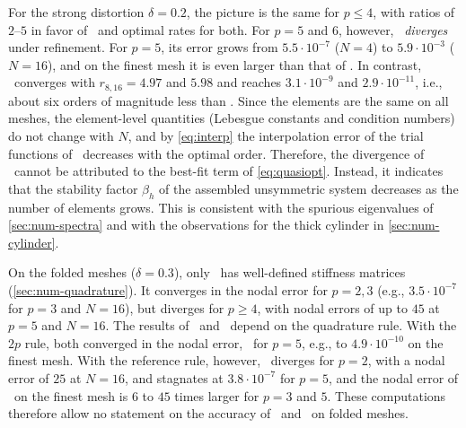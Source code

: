 For the strong distortion $\delta=0.2$, the picture is the same for $p\le4$, with ratios of $2$--$5$ in favor of \PM\ and optimal rates for both. For $p=5$ and $6$, however, \PM\ \emph{diverges} under refinement. For $p=5$, its error grows from $5.5\cdot10^{-7}$ ($N=4$) to $5.9\cdot10^{-3}$ ($N=16$), and on the finest mesh it is even larger than that of \PP. In contrast, \PH\ converges with $r_{8,16}=4.97$ and $5.98$ and reaches $3.1\cdot10^{-9}$ and $2.9\cdot10^{-11}$, i.e., about six orders of magnitude less than \PM. Since the elements are the same on all meshes, the element-level quantities (Lebesgue constants and condition numbers) do not change with $N$, and by \cref{eq:interp} the interpolation error of the trial functions of \PM\ decreases with the optimal order. Therefore, the divergence of \PM\ cannot be attributed to the best-fit term of \cref{eq:quasiopt}. Instead, it indicates that the stability factor $\beta_h$ of the assembled unsymmetric system decreases as the number of elements grows. This is consistent with the spurious eigenvalues of \cref{sec:num-spectra} and with the observations for the thick cylinder in \cref{sec:num-cylinder}.

On the folded meshes ($\delta=0.3$), only \PM\ has well-defined stiffness matrices (\cref{sec:num-quadrature}). It converges in the nodal error for $p=2,3$ (e.g., $3.5\cdot10^{-7}$ for $p=3$ and $N=16$), but diverges for $p\ge4$, with nodal errors of up to $45$ at $p=5$ and $N=16$. The results of \PP\ and \PH\ depend on the quadrature rule. With the $2p$ rule, both converged in the nodal error, \PH\ for $p=5$, e.g., to $4.9\cdot10^{-10}$ on the finest mesh. With the reference rule, however, \PH\ diverges for $p=2$, with a nodal error of $25$ at $N=16$, and stagnates at $3.8\cdot10^{-7}$ for $p=5$, and the nodal error of \PP\ on the finest mesh is $6$ to $45$ times larger for $p=3$ and $5$. These computations therefore allow no statement on the accuracy of \PP\ and \PH\ on folded meshes.
%
